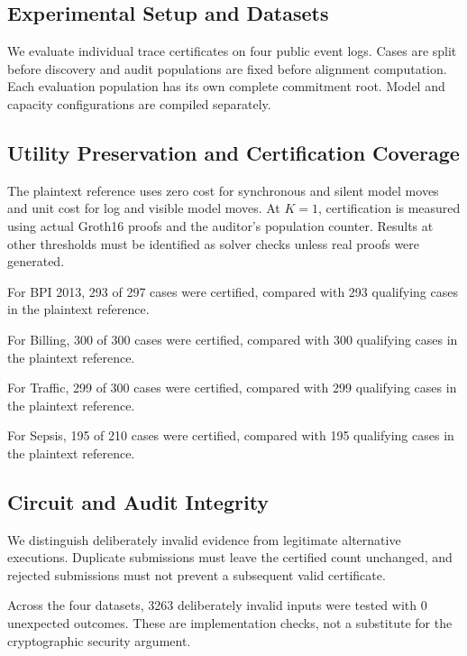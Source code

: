 
\subsection{Experimental Setup and Datasets}

We evaluate individual trace certificates on four public event logs. Cases are split before discovery and audit populations are fixed before alignment computation. Each evaluation population has its own complete commitment root. Model and capacity configurations are compiled separately.

\subsection{Utility Preservation and Certification Coverage}

The plaintext reference uses zero cost for synchronous and silent model moves and unit cost for log and visible model moves. At $K=1$, certification is measured using actual Groth16 proofs and the auditor's population counter. Results at other thresholds must be identified as solver checks unless real proofs were generated.

For BPI 2013, 293 of 297 cases were certified, compared with 293 qualifying cases in the plaintext reference.

For Billing, 300 of 300 cases were certified, compared with 300 qualifying cases in the plaintext reference.

For Traffic, 299 of 300 cases were certified, compared with 299 qualifying cases in the plaintext reference.

For Sepsis, 195 of 210 cases were certified, compared with 195 qualifying cases in the plaintext reference.

\subsection{Circuit and Audit Integrity}

We distinguish deliberately invalid evidence from legitimate alternative executions. Duplicate submissions must leave the certified count unchanged, and rejected submissions must not prevent a subsequent valid certificate.

Across the four datasets, 3263 deliberately invalid inputs were tested with 0 unexpected outcomes. These are implementation checks, not a substitute for the cryptographic security argument.

